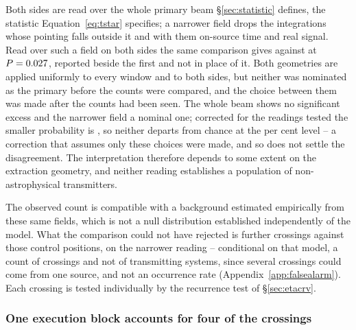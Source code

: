 Both sides are read over the whole primary beam \S\ref{sec:statistic} defines,
the statistic Equation~\ref{eq:tstar} specifies; a narrower field drops the
integrations whose pointing falls outside it and with them on-source time and
real signal. Read over such a field on both sides the same comparison gives
\FrNarrowObs{} against \FrNarrowExp{} at $P=0.027$, reported beside the
first and not in place of it. Both geometries are applied uniformly to every
window and to both sides, but neither was nominated as the primary before the
counts were compared, and the choice between them was made after the counts had
been seen. The whole beam shows no significant excess and the narrower field a
nominal one; corrected for the \FrNRead{} readings tested the smaller
probability is \FrTwoTrialP, so neither departs from chance at the
\CeAlphaPct{} per cent level -- a correction that assumes only these \FrNRead{}
choices were made, and so does not settle the disagreement. The interpretation
therefore depends to some extent on the extraction geometry, and neither
reading establishes a population of non-astrophysical transmitters.

The observed count is compatible with a background estimated empirically from
these same fields, which is not a null distribution established independently
of the model. What the comparison could not have rejected is \CeAddLim{}
further crossings against those control positions, \FrNarrowAddLim{} on the
narrower reading -- conditional on that model, a count of crossings and not of
transmitting systems, since several crossings could come from one source, and
not an occurrence rate (Appendix~\ref{app:falsealarm}). Each crossing is
tested individually by the recurrence test of \S\ref{sec:etacrv}.

\subsubsection{One execution block accounts for four of the crossings}
\label{sec:bdblock}

